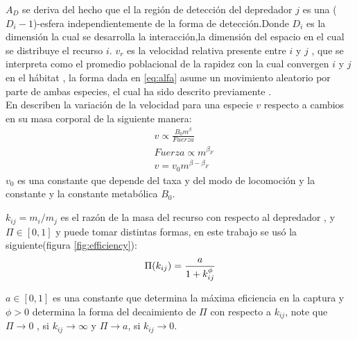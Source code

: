 $A_D$ se deriva del hecho que el la regi\'on de detecci\'on del depredador $j$ es una ($D_i-1$)-esfera independientemente de la forma de detecci\'on\citep{pawar2012dimensionality}.Donde $D_i$ es la dimensi\'on la cual se desarrolla la interacci\'on,la dimensi\'on del espacio en el cual se distribuye el recurso $i$.
$v_r$ es la velocidad relativa presente entre $i$ y $j$ , que se interpreta como el promedio poblacional de la rapidez con la cual convergen $i$ y $j$ en el h\'abitat \citep[supinfo.]{pawar2012dimensionality} , la forma dada en \eqref{eq:alfa} asume un movimiento aleatorio por parte de ambas especies, el cual ha sido descrito previamente \citep{okubo2001diffusion}.\\
En \cite{pawar2012dimensionality} describen la variaci\'on de la velocidad para una especie $v$ respecto a cambios en su masa corporal de la siguiente manera:
\begin{equation}\label{eq:vel}
\begin{aligned}
&v \propto \frac{B_0 m^\beta}{Fuerza}\\
&Fuerza \propto m^{\beta_F} \\
&v = v_0m^{\beta - \beta_F}
\end{aligned}
\end{equation}
$v_0$ es una constante que depende del taxa y del modo de locomoci\'on y la constante y la constante metab\'olica $B_0$.\\ 

$k_{ij}= m_i/m_j$ es el raz\'on de la masa del recurso con respecto al depredador , y $\Pi \in [0,1]$ y  puede tomar distintas formas\citep{weitz2006size}, en este trabajo se us\'o la siguiente(figura \ref{fig:efficiency}): 
\begin{equation}\label{eq:sr}
\Pi(k_{ij}) =\frac{a}{1+k_{ij}^\phi} \\
\end{equation}

$a \in [0,1] $ es una constante que determina la m\'axima eficiencia en la captura y $\phi > 0 $ determina la forma del decaimiento de $\Pi$ con respecto a $k_{ij}$, note que $\Pi \to 0$ , si $k_{ij} \to \infty$ y $\Pi \to a $, si $k_{ij} \to 0$.

